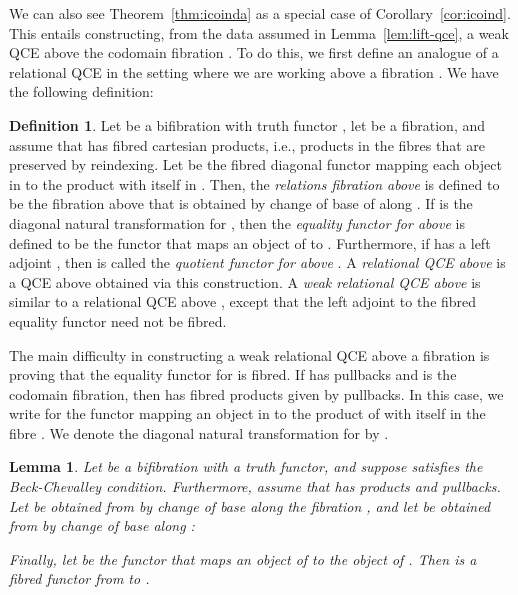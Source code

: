\documentclass{LMCS}
\theoremstyle{plain}
\newtheorem{lemma}[theorem]{Lemma}
\theoremstyle{remark}
\theoremstyle{definition}
\newtheorem{definition}[theorem]{Definition}
\begin{document}
\noindent
We can also see Theorem~\ref{thm:icoinda} as a special case of
Corollary~\ref{cor:icoind}. This entails constructing, from the data
assumed in Lemma~\ref{lem:lift-qce}, a weak QCE above the codomain
fibration .  To do this, we first define an analogue of
a relational QCE in the setting where we are working above a fibration
. We have the following definition:

\begin{definition}\label{def:relqceabover}
  Let  be a bifibration with truth functor , let
   be a fibration, and assume that  has fibred cartesian
  products, i.e., products in the fibres that are preserved by
  reindexing. Let  be the fibred diagonal functor
  mapping each object  in  to the product with itself in
  .  Then, the {\em relations fibration above } is defined to
  be the fibration  above  that is
  obtained by change of base of  along . If
   is the diagonal natural transformation
  for , then the {\em equality functor for  above } is
  defined to be the functor  that maps an object
   of  to .  Furthermore, if  has a
  left adjoint , then  is called the {\em quotient functor
    for  above }.  A {\em relational QCE above } is a QCE
  above  obtained via this construction. A {\em weak relational QCE
    above } is similar to a relational QCE above , except that
  the left adjoint to the fibred equality functor need not be fibred.
\end{definition}

The main difficulty in constructing a weak relational QCE  above a
fibration  is proving that the equality functor for  is
fibred. If  has pullbacks and  is the codomain
fibration, then  has fibred products given by pullbacks.  In this
case, we write  for the functor mapping
an object  in  to the product  of  with itself
in the fibre . We denote the diagonal natural
transformation for  by .


\begin{lemma}\label{lem:carts}
Let  be a bifibration with a truth functor, and suppose
 satisfies the Beck-Chevalley condition. Furthermore, assume that
 has products and pullbacks. Let  be obtained
from  by change of base along the fibration , and let
 be obtained from  by change of base
along :
 
Finally, let  be the functor
that maps an object  of  to the object
 of . Then
 is a fibred functor from  to
.
\end{lemma}
\end{document}
